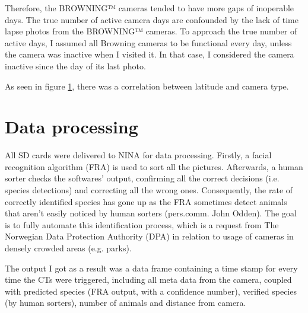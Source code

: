 Therefore, the BROWNING™ cameras tended to have more gaps of inoperable days.
The true number of active camera days are confounded by the lack of time lapse photos from the BROWNING™ cameras. To approach the true number of active days, I assumed all Browning cameras to be functional every day, unless the camera was inactive when I visited it. In that case, I considered the camera inactive since the day of its last photo.


As seen in figure \ref{fig:map}, %
there was a correlation between latitude and camera type.



\begin{figure}
	\label{fig:map}
\end{figure}




\section{Data processing} %
All SD cards were delivered to NINA for data processing.
Firstly, a facial recognition algorithm (FRA)  is used to sort all the pictures. %
Afterwards, a human sorter checks the softwares' output, confirming all the correct decisions (i.e. species detections) and correcting all the wrong ones. 
Consequently, the rate of correctly identified species has gone up as the FRA sometimes detect animals that aren't easily noticed by human sorters (pers.comm. John Odden). 
The goal is to fully automate this identification process, which is a request from The Norwegian Data Protection Authority (DPA) in relation to usage of cameras in densely crowded areas (e.g. parks).





The output I got as a result was a data frame containing a time stamp for every time the CTs were triggered, %
including all meta data from the camera, coupled with predicted species (FRA output, with a confidence number), verified species (by human sorters), number of animals and distance from camera.

